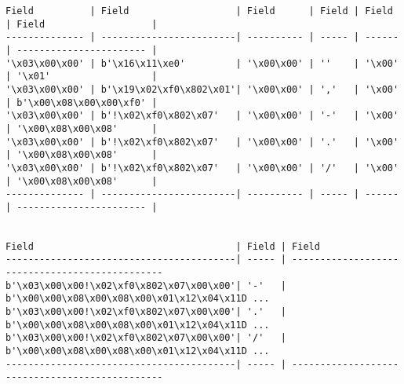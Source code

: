 \begin{verbatim}
Field          | Field                   | Field      | Field | Field  | Field                   |
-------------- | ------------------------| ---------- | ----- | ------ | ----------------------- | 
'\x03\x00\x00' | b'\x16\x11\xe0'         | '\x00\x00' | ''    | '\x00' | '\x01'                  | 
'\x03\x00\x00' | b'\x19\x02\xf0\x802\x01'| '\x00\x00' | ','   | '\x00' | b'\x00\x08\x00\x00\xf0' | 
'\x03\x00\x00' | b'!\x02\xf0\x802\x07'   | '\x00\x00' | '-'   | '\x00' | '\x00\x08\x00\x08'      | 
'\x03\x00\x00' | b'!\x02\xf0\x802\x07'   | '\x00\x00' | '.'   | '\x00' | '\x00\x08\x00\x08'      | 
'\x03\x00\x00' | b'!\x02\xf0\x802\x07'   | '\x00\x00' | '/'   | '\x00' | '\x00\x08\x00\x08'      | 
-------------- | ------------------------| ---------- | ----- | ------ | ----------------------- | 


Field                                    | Field | Field                                          
-----------------------------------------| ----- | -----------------------------------------------
b'\x03\x00\x00!\x02\xf0\x802\x07\x00\x00'| '-'   | b'\x00\x00\x08\x00\x08\x00\x01\x12\x04\x11D ...
b'\x03\x00\x00!\x02\xf0\x802\x07\x00\x00'| '.'   | b'\x00\x00\x08\x00\x08\x00\x01\x12\x04\x11D ...
b'\x03\x00\x00!\x02\xf0\x802\x07\x00\x00'| '/'   | b'\x00\x00\x08\x00\x08\x00\x01\x12\x04\x11D ...
-----------------------------------------| ----- | -----------------------------------------------
\end{verbatim}
